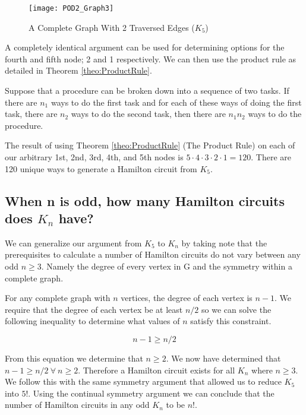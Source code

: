 \begin{figure}[ht]
\centering
\texttt{[image: POD2\_Graph3]}
\caption{A Complete Graph With 2 Traversed Edges ($K_5$)}
\label{fig:K5_2}
\end{figure}

A completely identical argument can be used for determining options for the fourth and fifth node; 2 and 1 respectively. We can then use the product rule as detailed in Theorem \ref{theo:ProductRule}.

\begin{theo}
Suppose that a procedure can be broken down into a sequence of
two tasks. If there are $n_1$ ways to do the first task and for each of these ways of doing the first
task, there are $n_2$ ways to do the second task, then there are $n_1n_2$ ways to do the procedure.
\label{theo:ProductRule}
\end{theo}

The result of using Theorem \ref{theo:ProductRule} (The Product Rule) on each of our arbitrary 1st, 2nd, 3rd, 4th, and 5th nodes is $5\cdot4\cdot3\cdot2\cdot1=120$. There are 120 unique ways to generate a Hamilton circuit from $K_5$.

\subsection{When n is odd, how many Hamilton circuits does $K_n$ have?}
We can generalize our argument from $K_5$ to $K_n$ by taking note that the prerequisites to calculate a number of Hamilton circuits do not vary between any odd $n \geq 3$. Namely the degree of every vertex in G and the symmetry within a complete graph.


For any complete graph with $n$ vertices, the degree of each vertex is $n-1$. We require that the degree of each vertex be at least $n/2$ so we can solve the following inequality to determine what values of $n$ satisfy this constraint.

\begin{equation}
n-1 \geq n/2
\end{equation}

From this equation we determine that $n \geq 2$. We now have determined that $n-1 \geq n/2 ~\forall~ n \geq 2$. Therefore a Hamilton circuit exists for all $K_n$ where $n \geq 3$. We follow this with the same symmetry argument that allowed us to reduce $K_5$ into $5!$. Using the continual symmetry argument we can conclude that the number of Hamilton circuits in any odd $K_n$ to be $n!$.